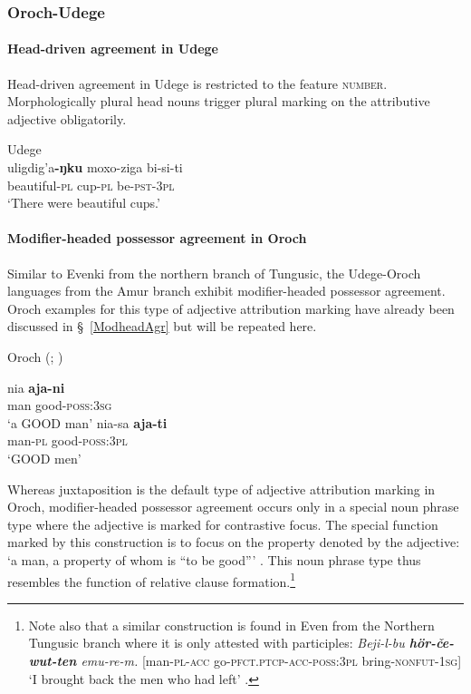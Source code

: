 \subsubsection{Oroch-Udege}
\paragraph{Head-driven agreement in Udege}
Head-driven agreement in Udege is restricted to the feature \textsc{number}. Morphologically plural head nouns trigger plural marking on the attributive adjective obligatorily.
\begin{exe}
\ex 
\rm{Udege \citep[468]{nikolaeva-etal2001}}\\
\gll	uligdig'a\textbf{-ŋku} moxo-ziga bi-si-ti\\
	beautiful\textsc{-pl} cup\textsc{-pl} be\textsc{-pst-3pl}\\
\glt	‘There were beautiful cups.’
\end{exe}

\paragraph{Modifier-headed possessor agreement in Oroch}
Similar to Evenki from the northern branch of Tungusic, the Udege-Oroch languages from the Amur branch exhibit modifier-headed possessor agreement. Oroch examples for this type of adjective attribution marking have already been discussed in \S~\ref{ModheadAgr} but will be repeated here.
\begin{exe}
\ex 
\label{oroch modhead}
\rm{Oroch (\citealt[207]{avrorin-etal1967}; \citealt[3]{malchukov2000})}
\begin{xlist}
\ex
\gll 	nia	\textbf{aja-ni}\\
	man good-\textsc{poss:3sg}\\
\glt	‘a GOOD man’
\ex
\gll nia-sa \textbf{aja-ti}\\	
	man-\textsc{pl} good-\textsc{poss:3pl}\\
\glt	‘GOOD men’
\end{xlist}
\end{exe}
Whereas juxtaposition is the default type of adjective attribution marking in Oroch, modifier-headed possessor agreement occurs only in a special noun phrase type where the adjective is marked for contrastive focus. The special function marked by this construction is to focus on the property denoted by the adjective: ‘a man, a property of whom is “to be good”’ \citep[3]{malchukov2000}. This noun phrase type thus resembles the function of relative clause formation.\footnote{Note also that a similar construction is found in Even from the Northern Tungusic branch where it is only attested with participles: \textit{Beji-l-bu \textbf{hör-če-wut-ten} emu-re-m.} [man-\textsc{pl}-\textsc{acc} go-\textsc{pfct.ptcp}-\textsc{acc}-\textsc{poss:3pl} bring-\textsc{nonfut}-\textsc{1sg}] ‘I brought back the men who had left’ \citep[31]{malchukov1995}.}

